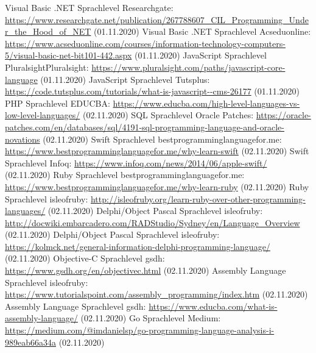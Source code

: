 \documentclass[ngerman]{article}
\begin{document}
\begin{thebibliography}{9}
        Visual Basic .NET Sprachlevel Researchgate: \url{https://www.researchgate.net/publication/267788607_CIL_Programming_Under_the_Hood_of_NET} (01.11.2020)
        Visual Basic .NET Sprachlevel Acseduonline: \url{https://www.acseduonline.com/courses/information-technology-computers-5/visual-basic-net-bit101-442.aspx} (01.11.2020)
        JavaScript Sprachlevel PluralsightPluralsight: \url{https://www.pluralsight.com/paths/javascript-core-language} (01.11.2020)
        JavaScript Sprachlevel Tutsplus: \url{https://code.tutsplus.com/tutorials/what-is-javascript--cms-26177} (01.11.2020)
        PHP Sprachlevel EDUCBA: \url{https://www.educba.com/high-level-languages-vs-low-level-languages/} (02.11.2020)
        SQL Sprachlevel Oracle Patches: \url{https://oracle-patches.com/en/databases/sql/4191-sql-programming-language-and-oracle-novations} (02.11.2020)
        Swift Sprachlevel bestprogramminglanguagefor.me: \url{https://www.bestprogramminglanguagefor.me/why-learn-swift} (02.11.2020)
        Swift Sprachlevel Infoq: \url{https://www.infoq.com/news/2014/06/apple-swift/} (02.11.2020)
        Ruby Sprachlevel bestprogramminglanguagefor.me: \url{https://www.bestprogramminglanguagefor.me/why-learn-ruby} (02.11.2020)
        Ruby Sprachlevel isleofruby: \url{http://isleofruby.org/learn-ruby-over-other-programming-languages/} (02.11.2020)
        Delphi/Object Pascal Sprachlevel isleofruby: \url{http://docwiki.embarcadero.com/RADStudio/Sydney/en/Language_Overview} (02.11.2020)
        Delphi/Object Pascal Sprachlevel isleofruby: \url{https://kolmck.net/general-information-delphi-programming-language/} (02.11.2020)
        Objective-C Sprachlevel gsdh: \url{https://www.gsdh.org/en/objectivec.html} (02.11.2020)
        Assembly Language Sprachlevel isleofruby: \url{https://www.tutorialspoint.com/assembly_programming/index.htm} (02.11.2020)
        Assembly Language Sprachlevel gsdh: \url{https://www.educba.com/what-is-assembly-language/} (02.11.2020)
        Go Sprachlevel Medium: \url{https://medium.com/@imdanielsp/go-programming-language-analysis-i-989eab66a34a} (02.11.2020)

\end{thebibliography}
\end{document}
